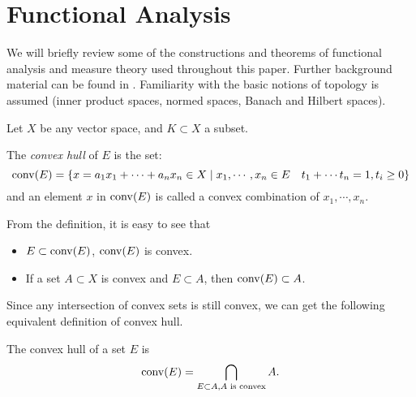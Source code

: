 \chapter{Functional Analysis}
\label{app:function_measure}



We will briefly review some of the constructions and theorems of functional
analysis and measure theory used throughout this paper. Further background
material can be found in
\cite{rudinFunctionalAnalysis1991,rudinRealComplexAnalysis1987}. Familiarity
with the basic notions of topology is assumed (inner product spaces, normed
spaces, Banach and Hilbert spaces).



Let $X$ be any vector space, and $K \subset X$ a subset.

\begin{definition}
   \label{def:convex_hull}
   The \textit{convex hull} of $E$ is the set:
   \begin{equation}
      \operatorname*{conv}(E) 
      = \{x = a_1x_1 + \cdots + a_nx_n \in X \mid 
      x_1, \cdots, x_n \in E \quad
      t_1 + \cdots t_n = 1, t_i \geq 0\}
   \end{equation}
   and an element $x$ in $\operatorname*{conv}(E)$ is called a convex combination of $x_1,
   \cdots, x_n$.
\end{definition}

From the definition, it is easy to see that 
\begin{itemize}
   \item $E \subset \operatorname*{conv}(E)$, $\operatorname*{conv}(E)$ is convex.
   \item If a set $A \subset X$ is convex and $E \subset A$, then $\operatorname*{conv}(E) \subset A$.
\end{itemize}

Since any intersection of convex sets is still convex, we can get the following
equivalent definition of convex hull.

\begin{proposition}
   The convex hull of a set $E$ is 
   \begin{equation}
      \operatorname*{conv}(E) = \bigcap_{E \subset A, A \text{ is convex}} A.
   \end{equation}   
\end{proposition}

